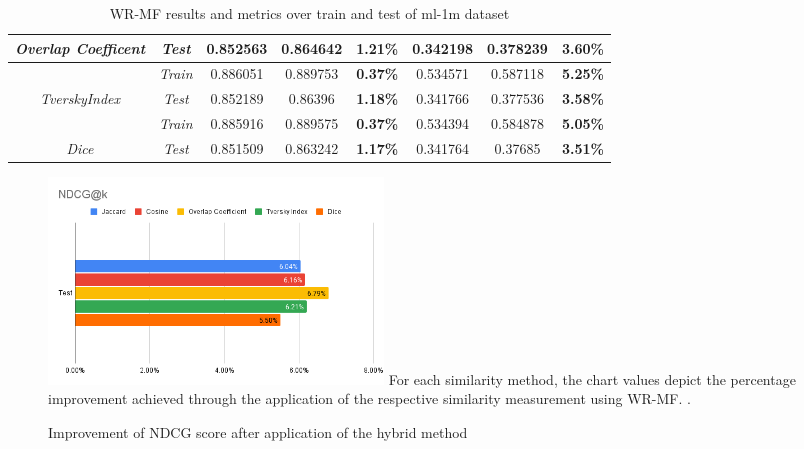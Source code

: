 \documentclass[journal]{IEEEtran}
\begin{document}
\begin{table}[htb]
{\begin{tabular}{|c|c|ccc|ccc|}
  \multirow{-2}{*}{\textit{Overlap Coefficent}}                   & \textit{Test}                  & \multicolumn{1}{c|}{0.852563}      & \multicolumn{1}{c|}{0.864642}      & \cellcolor[HTML]{F3F3F3}\textbf{1.21\%} & \multicolumn{1}{c|}{0.342198}       & \multicolumn{1}{c|}{0.378239}       & \cellcolor[HTML]{F3F3F3}\textbf{3.60\%} \\ \hline
  \cellcolor[HTML]{FFFFFF}                                        & \textit{Train}                 & \multicolumn{1}{c|}{0.886051}      & \multicolumn{1}{c|}{0.889753}      & \cellcolor[HTML]{F3F3F3}\textbf{0.37\%} & \multicolumn{1}{c|}{0.534571}       & \multicolumn{1}{c|}{0.587118}       & \cellcolor[HTML]{F3F3F3}\textbf{5.25\%} \\ \cline{2-8} 
  \multirow{-2}{*}{\cellcolor[HTML]{FFFFFF}\textit{TverskyIndex}} & \textit{Test}                  & \multicolumn{1}{c|}{0.852189}      & \multicolumn{1}{c|}{0.86396}       & \cellcolor[HTML]{F3F3F3}\textbf{1.18\%} & \multicolumn{1}{c|}{0.341766}       & \multicolumn{1}{c|}{0.377536}       & \cellcolor[HTML]{F3F3F3}\textbf{3.58\%} \\ \hline
                                                                  & \textit{Train}                 & \multicolumn{1}{c|}{0.885916}      & \multicolumn{1}{c|}{0.889575}      & \cellcolor[HTML]{F3F3F3}\textbf{0.37\%} & \multicolumn{1}{c|}{0.534394}       & \multicolumn{1}{c|}{0.584878}       & \cellcolor[HTML]{F3F3F3}\textbf{5.05\%} \\ \cline{2-8} 
  \multirow{-2}{*}{\textit{Dice}}                                 & \textit{Test}                  & \multicolumn{1}{c|}{0.851509}      & \multicolumn{1}{c|}{0.863242}      & \cellcolor[HTML]{F3F3F3}\textbf{1.17\%} & \multicolumn{1}{c|}{0.341764}       & \multicolumn{1}{c|}{0.37685}        & \cellcolor[HTML]{F3F3F3}\textbf{3.51\%} \\ \hline
  \end{tabular}%
  }
  \caption{WR-MF results and metrics over train and test of ml-1m dataset}
  \label{table:wrmf_scores}
\end{table}


\begin{figure}[!t]
  \centering
  \includegraphics[width=3.5in]{picture/WR_MF-NDCG@k.png}
  For each similarity method, the chart values depict the percentage improvement achieved through the application of the respective 
  similarity measurement using WR-MF.
  \DeclareGraphicsExtensions.
  \caption{Improvement of NDCG score after application of the hybrid method}
  \label{fig:wrmf_ndcg}
\end{figure}
\end{document}
